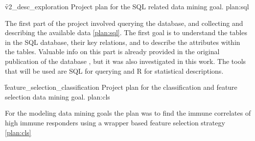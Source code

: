 \f{v2_desc_exploration}
{Project plan for the SQL related data mining goal.}
{plan:sql}

The first part of the project involved querying the database, and collecting
and describing the available data \autoref{plan:sql}. The first goal is to
understand the tables in the SQL database, their key relations, and to describe
the attributes within the tables. Valuable info on this part is already
provided in the original publication of the database
\cite{tomicFluPRINTDatasetMultidimensional2019}, but it was also investigated
in this work. The tools that will be used are SQL for querying and R for
statistical descriptions.


%

\f{feature_selection_classification}
{Project plan for the classification and feature selection data mining goal.}
{plan:cls}

For the modeling data mining goals the plan was to find the immune correlates
of high immune responders using a wrapper based feature selection strategy
\autoref{plan:cls}

\printbibliography

